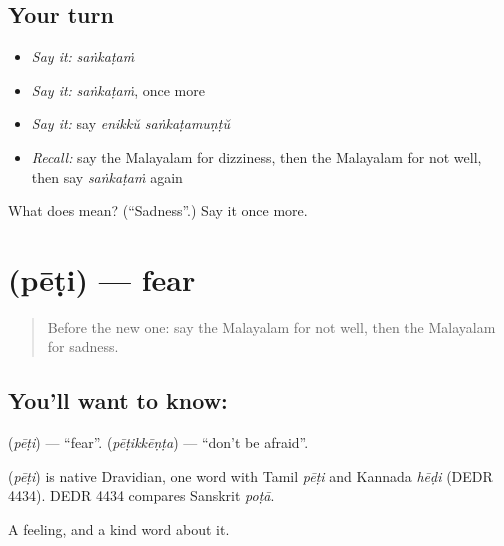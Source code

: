 \subsection*{Your turn}
\begin{itemize}
\raggedright
  \item \emph{Say it:} \emph{saṅkaṭaṁ}
  \item \emph{Say it:} \emph{saṅkaṭaṁ}, once more
  \item \emph{Say it:} say \emph{enikkŭ saṅkaṭamuṇṭŭ}
  \item \emph{Recall:} say the Malayalam for dizziness, then the Malayalam for not well, then say \emph{saṅkaṭaṁ} again
\end{itemize}

\begin{tcolorbox}[breakable,colback=teal!4,colframe=teal!35!black,title={Before you move on}]
What does  mean? (\textquotedblleft{}Sadness\textquotedblright{}.) Say it once more.
\end{tcolorbox}
\section[\texorpdfstring{\ml{പേടി} (pēṭi)}{പേടി (pēṭi)}]{ (pēṭi) — fear}

\label{lesson:ML-C116-fear}



\begin{quote}
Before the new one: say the Malayalam for not well, then the Malayalam for sadness.
\end{quote}

\subsection*{You'll want to know: }
\textbf{} (\emph{pēṭi}) — \textquotedblleft{}fear\textquotedblright{}. \textbf{} (\emph{pēṭikkēṇṭa}) — \textquotedblleft{}don't be afraid\textquotedblright{}.

\begin{cousinweb}
\textbf{} (\emph{pēṭi}) is native Dravidian, one word with Tamil \emph{pēṭi} and Kannada \emph{hēḍi} (DEDR 4434). DEDR 4434 compares Sanskrit \emph{poṭā}.
\end{cousinweb}

\begin{grammarlens}[title={What you've built}]
A feeling, and a kind word about it.
\end{grammarlens}

